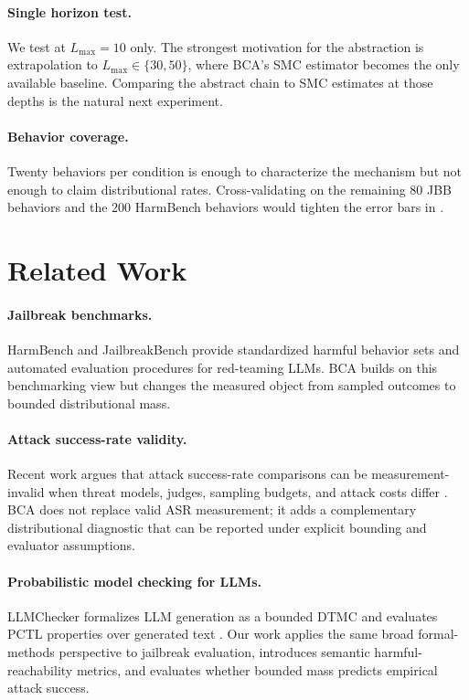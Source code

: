 \documentclass[11pt]{article}
\newcommand{\BCA}{\textsc{BCA}}
\newcommand{\ASR}{\textsc{ASR}}
\newcommand{\SMC}{\textsc{SMC}}
\newcommand{\DTMC}{\textsc{DTMC}}
\begin{document}
\paragraph{Single horizon test.}
We test at $L_\mathrm{max}=10$ only.  The strongest motivation for the abstraction is extrapolation to $L_\mathrm{max} \in \{30, 50\}$, where \BCA{}'s \SMC{} estimator becomes the only available baseline.  Comparing the abstract chain to \SMC{} estimates at those depths is the natural next experiment.

\paragraph{Behavior coverage.}
Twenty behaviors per condition is enough to characterize the mechanism but not enough to claim distributional rates.  Cross-validating on the remaining 80 JBB behaviors and the 200 HarmBench behaviors would tighten the error bars in .

\section{Related Work}
\label{sec:related}

\paragraph{Jailbreak benchmarks.}
HarmBench and JailbreakBench provide standardized harmful behavior sets and automated evaluation procedures for red-teaming LLMs.  \BCA{} builds on this benchmarking view but changes the measured object from sampled outcomes to bounded distributional mass.

\paragraph{Attack success-rate validity.}
Recent work argues that attack success-rate comparisons can be measurement-invalid when threat models, judges, sampling budgets, and attack costs differ \cite{chouldechova2026measurement}.  \BCA{} does not replace valid \ASR{} measurement; it adds a complementary distributional diagnostic that can be reported under explicit bounding and evaluator assumptions.

\paragraph{Probabilistic model checking for LLMs.}
LLMChecker formalizes LLM generation as a bounded \DTMC{} and evaluates PCTL properties over generated text \cite{gross2025llmchecker}.  Our work applies the same broad formal-methods perspective to jailbreak evaluation, introduces semantic harmful-reachability metrics, and evaluates whether bounded mass predicts empirical attack success.
\end{document}
